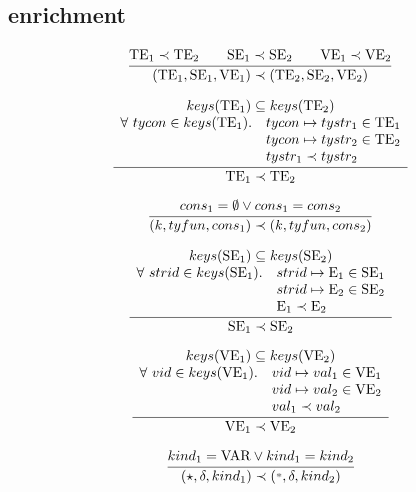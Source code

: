\documentclass[11pt,a4paper]{article}
\newcommand{\E}  {\textrm{E}}
\newcommand{\TE} {\textrm{TE}}
\newcommand{\VE} {\textrm{VE}}
\newcommand{\SE} {\textrm{SE}}
\newcommand{\VKV}  {\textrm{VAR}}
\newcommand{\KEYS}[1]{keys(#1)}
\newcommand{\TYNAMES}[1]{\KEYS{#1}}
\newcommand{\wildcard}{{\color{gray}\scriptstyle\textbf{*}}}
\newcommand{\absval}{\star}
\begin{document}
\subsection{enrichment}
\[
\cfrac
 {\enrichE{\TE_1}{\TE_2} \qquad \enrichE{\SE_1}{\SE_2} \qquad \enrichE{\VE_1}{\VE_2}}
 {\enrichE{(\TE_1,\SE_1,\VE_1)}{(\TE_2,\SE_2,\VE_2)}}
\]

\[
\cfrac
 {\begin{array}{cl}
  \multicolumn{2}{c}{\TYNAMES{\TE_1}\subseteq\TYNAMES{\TE_2}}   \\
  \forall\ tycon \in \TYNAMES{\TE_1}. 
    & tycon \mapsto tystr_1 \in \TE_1    \\
    & tycon \mapsto tystr_2 \in \TE_2    \\
    & \enrichE{tystr_1}{tystr_2}
  \end{array}}
 {\enrichE{\TE_1}{\TE_2}}
\]

\[
\cfrac
 {cons_1 = \emptyset \vee cons_1 = cons_2}
 {(k, tyfun, cons_1) \prec (k, tyfun, cons_2)}
\]

\[
\cfrac
 {\begin{array}{cl}
  \multicolumn{2}{c}{\KEYS{\SE_1} \subseteq \KEYS{\SE_2}}   \\
  \forall\ strid \in \KEYS{\SE_1}. 
    & strid \mapsto \E_1 \in \SE_1 \\
    & strid \mapsto \E_2 \in \SE_2 \\
    & \enrichE{\E_1}{\E_2}
  \end{array}}
 {\enrichE{\SE_1}{\SE_2}}
\]

\[
\cfrac
 {\begin{array}{cl}
  \multicolumn{2}{c}{\KEYS{\VE_1} \subseteq \KEYS{\VE_2}}   \\
  \forall\ vid \in \KEYS{\VE_1}. 
    & vid \mapsto val_1 \in \VE_1 \\
    & vid \mapsto val_2 \in \VE_2 \\
    & \enrichE{val_1}{val_2}
  \end{array}}
 {\enrichE{\VE_1}{\VE_2}}
\]

\[
\cfrac
 {kind_1 = \VKV \vee kind_1 = kind_2}
 {\enrichE{(\absval,\delta,kind_1)}{(\wildcard, \delta, kind_2)}}
\]
\end{document}
